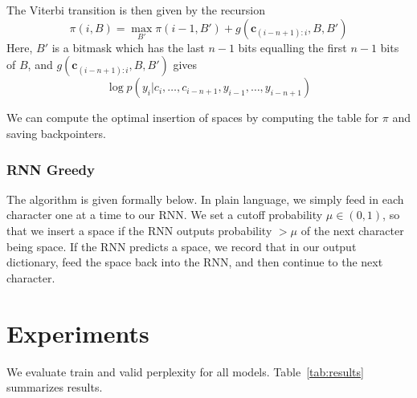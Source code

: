 \documentclass[11pt]{article}
\begin{document}
The Viterbi transition is then given by the recursion
$$\pi(i, B) = \max_{B'} \pi(i-1, B') + g(\mathbf{c}_{(i-n+1):i}, B, B')$$
Here, $B'$ is a bitmask which has the last $n-1$ bits equalling the first $n-1$ bits of $B$, and $g(\mathbf{c}_{(i-n+1):i}, B, B')$ gives
$$\log p(y_i | c_i, \ldots, c_{i-n+1}, y_{i-1}, \ldots, y_{i-n+1})$$

We can compute the optimal insertion of spaces by computing the table for $\pi$ and saving backpointers.

\subsubsection{RNN Greedy}

The algorithm is given formally below. In plain language, we simply feed in each character one at a time to our RNN. We set a cutoff probability $\mu \in (0, 1)$, so that we insert a space if the RNN outputs probability $> \mu$ of the next character being space. If the RNN predicts a space, we record that in our output dictionary, feed the space back into the RNN, and then continue to the next character. 

\begin{algorithmic}
      \EndIf{}
      \EndIf{}
    \EndWhile{}
  \EndProcedure{}
\end{algorithmic}

\section{Experiments}

We evaluate train and valid perplexity for all models. Table~\ref{tab:results} summarizes results.
\end{document}
